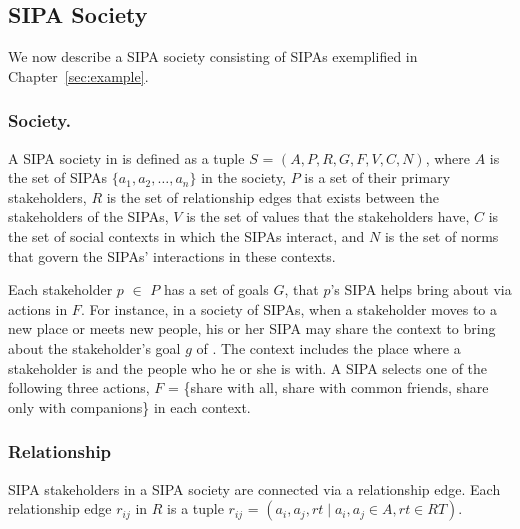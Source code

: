 

\subsection{\frameworkAinur SIPA Society}
We now describe a SIPA society consisting of \locationapp SIPAs exemplified in Chapter~\ref{sec:example}. 

\subsubsection{Society.} A SIPA society in \frameworkAinur is defined as a tuple $S$ = $(A, P, R, G, F, V, C, N)$, where $A$ is the
set of SIPAs $\{a_1, a_2, \ldots, a_n\}$ in the society, $P$ is a set of their primary stakeholders, $R$ is the set of
relationship edges that exists between the stakeholders of the SIPAs, $V$ is the
set of values that the stakeholders have, $C$ is the set of
social contexts in which the SIPAs interact, and $N$ is the set of norms
that govern the SIPAs' interactions in these contexts.

Each stakeholder $p$ $\in$ $P$ has a set of goals $G$, that $p$'s SIPA helps bring about via actions in $F$. 
% 
For instance, in a society of \locationapp SIPAs, when a stakeholder moves to a new place or meets new people, his or her SIPA may share the context to bring about the stakeholder's goal $g$ of . The context includes the place where a stakeholder is and the people who he or she is with. 
A SIPA selects one of the following three actions, $F$ = \{share with all, share with common friends, share only with companions\} in each context. 

\subsubsection{Relationship}
SIPA stakeholders in a SIPA society are connected via a relationship edge. 
Each relationship edge $r_{ij}$ in $R$ is a tuple $r_{ij}$ = $(a_i, a_j,
rt \mid a_i, a_j \in A, rt \in RT)$.

